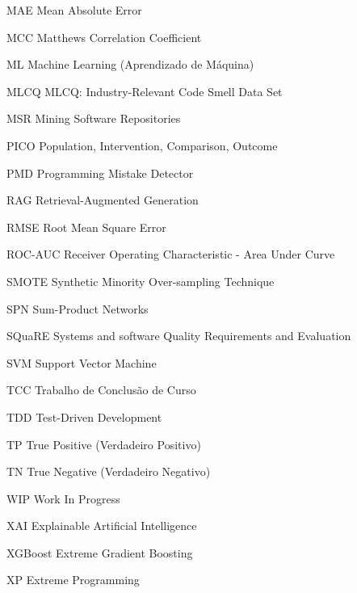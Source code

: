 \begin{siglas}
  \item[MAE] Mean Absolute Error
  \item[MCC] Matthews Correlation Coefficient
  \item[ML] Machine Learning (Aprendizado de Máquina)
  \item[MLCQ] MLCQ: Industry-Relevant Code Smell Data Set
  \item[MSR] Mining Software Repositories
  \item[PICO] Population, Intervention, Comparison, Outcome
  \item[PMD] Programming Mistake Detector
  \item[RAG] Retrieval-Augmented Generation
  \item[RMSE] Root Mean Square Error
  \item[ROC-AUC] Receiver Operating Characteristic - Area Under Curve
  \item[SMOTE] Synthetic Minority Over-sampling Technique
  \item[SPN] Sum-Product Networks
  \item[SQuaRE] Systems and software Quality Requirements and Evaluation
  \item[SVM] Support Vector Machine
  \item[TCC] Trabalho de Conclusão de Curso
  \item[TDD] Test-Driven Development
  \item[TP] True Positive (Verdadeiro Positivo)
  \item[TN] True Negative (Verdadeiro Negativo)
  \item[WIP] Work In Progress
  \item[XAI] Explainable Artificial Intelligence
  \item[XGBoost] Extreme Gradient Boosting
  \item[XP] Extreme Programming
\end{siglas}
